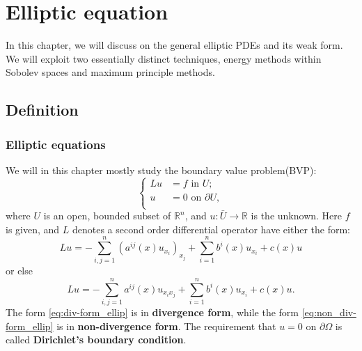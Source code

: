 \chapter{Elliptic equation}
In this chapter, we will discuss on the general elliptic PDEs and its weak form. We will exploit two essentially distinct techniques, energy methods within Sobolev spaces and maximum principle methods.
\section{Definition}
\subsection{Elliptic equations}
We will in this chapter mostly study the boundary value problem(BVP):
\begin{equation}
    \label{eq:Elliptic_eq}
    \left\{
        \begin{aligned}
            Lu&=f\text{ in }U;\\
            u&=0\text{ on }\partial U,\\
        \end{aligned}
    \right.
\end{equation} 
where $U$ is an open, bounded subset of $\mathbb{R}^{n}$, and $u:\bar{U}\rightarrow\mathbb{R}$ is the unknown. Here $f$ is given, and $L$ denotes a second order differential operator have either the form:
\begin{equation}
    \label{eq:div-form_ellip}
    Lu=-\sum_{i,j=1}^{n}\left(a^{ij}(x)u_{x_{i}}\right)_{x_{j}}+\sum_{i=1}^{n}b^{i}(x)u_{x_{i}}+c(x)u
\end{equation}
or else 
\begin{equation}
    \label{eq:non_div-form_ellip}
    Lu=-\sum_{i,j=1}^{n}a^{ij}(x)u_{x_{i}x_{j}}+\sum_{i=1}^{n}b^{i}(x)u_{x_{i}}+c(x)u.
\end{equation}
The form \eqref{eq:div-form_ellip} is in \textbf{divergence form}, while the form \eqref{eq:non_div-form_ellip} is in \textbf{non-divergence form}. The requirement that $u=0$ on $\partial\Omega$ is called \textbf{Dirichlet's boundary condition}.

